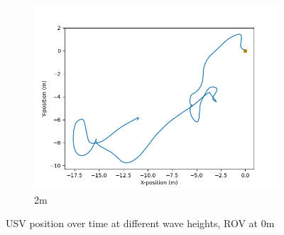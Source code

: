 \documentclass[class=article, crop=false]{standalone}
\begin{document}
\begin{figure}
\begin{subfigure}[b]{0.48\textwidth}
        \includegraphics{scenario1/rov-0m/2.0m/usv_position_controlled}
        \caption{2m}
        \label{}
    \end{subfigure}

    \caption{USV position over time at different wave heights, ROV at 0m}
\end{figure}
\end{document}
